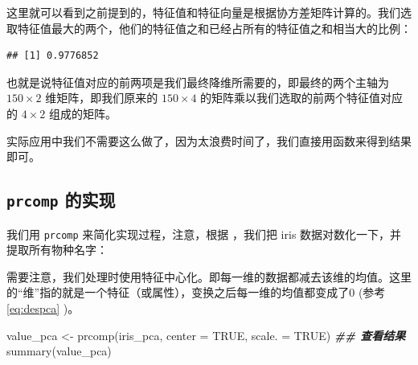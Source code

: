 \documentclass[
]{krantz}
\makeatletter
\newenvironment{Shaded}{\begin{snugshade}}{\end{snugshade}}
\newcommand{\AttributeTok}[1]{\textcolor[rgb]{0.77,0.63,0.00}{#1}}
\newcommand{\ConstantTok}[1]{\textcolor[rgb]{0.00,0.00,0.00}{#1}}
\newcommand{\DecValTok}[1]{\textcolor[rgb]{0.00,0.00,0.81}{#1}}
\newcommand{\DocumentationTok}[1]{\textcolor[rgb]{0.56,0.35,0.01}{\textbf{\textit{#1}}}}
\newcommand{\FunctionTok}[1]{\textcolor[rgb]{0.00,0.00,0.00}{#1}}
\newcommand{\NormalTok}[1]{#1}
\newcommand{\OtherTok}[1]{\textcolor[rgb]{0.56,0.35,0.01}{#1}}
\newcommand{\SpecialCharTok}[1]{\textcolor[rgb]{0.00,0.00,0.00}{#1}}
\newcommand{\StringTok}[1]{\textcolor[rgb]{0.31,0.60,0.02}{#1}}
\newenvironment{kframe}{%
\medskip{}
\setlength{\fboxsep}{.8em}
 \def\at@end@of@kframe{}%
 \ifinner\ifhmode%
  \def\at@end@of@kframe{\end{minipage}}%
  \begin{minipage}{\columnwidth}%
 \fi\fi%
 \def\FrameCommand##1{\hskip\@totalleftmargin \hskip-\fboxsep
 \colorbox{shadecolor}{##1}\hskip-\fboxsep
     \hskip-\linewidth \hskip-\@totalleftmargin \hskip\columnwidth}%
 \MakeFramed {\advance\hsize-\width
   \@totalleftmargin\z@ \linewidth\hsize
   \@setminipage}}%
 {\par\unskip\endMakeFramed%
 \at@end@of@kframe}
\renewenvironment{Shaded}{\begin{kframe}}{\end{kframe}}
\makeatother
\begin{document}
这里就可以看到之前提到的，特征值和特征向量是根据协方差矩阵计算的。我们选取特征值最大的两个，他们的特征值之和已经占所有的特征值之和相当大的比例：

\begin{Shaded}
\end{Shaded}

\begin{verbatim}
## [1] 0.9776852
\end{verbatim}

也就是说特征值对应的前两项是我们最终降维所需要的，即最终的两个主轴为 \(150 \times 2\) 维矩阵，即我们原来的 \(150 \times 4\) 的矩阵乘以我们选取的前两个特征值对应的 \(4 \times 2\) 组成的矩阵。

实际应用中我们不需要这么做了，因为太浪费时间了，我们直接用函数来得到结果即可。

\hypertarget{prcom}{%
\subsection{\texorpdfstring{\texttt{prcomp} 的实现}{prcomp 的实现}}\label{prcom}}

我们用 \texttt{prcomp} 来简化实现过程，注意，根据 \citet{kemp2003modern}，我们把 iris 数据对数化一下，并提取所有物种名字：

\begin{Shaded}
\end{Shaded}

需要注意，我们处理时使用特征中心化。即每一维的数据都减去该维的均值。这里的``维''指的就是一个特征（或属性），变换之后每一维的均值都变成了0 (参考 \eqref{eq:despca} )。

\begin{Shaded}
\begin{Highlighting}[]
\NormalTok{value\_pca }\OtherTok{\textless{}{-}} \FunctionTok{prcomp}\NormalTok{(iris\_pca, }\AttributeTok{center =} \ConstantTok{TRUE}\NormalTok{, }\AttributeTok{scale. =} \ConstantTok{TRUE}\NormalTok{)}
\DocumentationTok{\#\# 查看结果}
\FunctionTok{summary}\NormalTok{(value\_pca)}
\end{Highlighting}
\end{Shaded}
\end{document}
